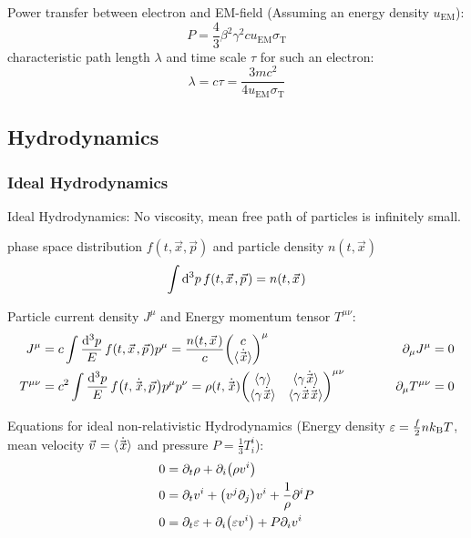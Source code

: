 			Power transfer between electron and EM-field (Assuming an energy density $u_\text{EM}$):
			\begin{equation}
				P = \frac{4}{3} \beta^2 \gamma^2 c u_\text{EM} \sigma_\text{T}
			\end{equation}
			characteristic path length $\lambda$ and time scale $\tau$ for such an electron:
			\begin{equation}
				\lambda = c\tau = \frac{3 m c^2}{4 u_\text{EM} \sigma_\text{T}}
			\end{equation}



	\subsection{Hydrodynamics}
		\subsubsection{Ideal Hydrodynamics}	
			Ideal Hydrodynamics: No viscosity, mean free path of particles is infinitely small.

			\noindent
			phase space distribution $f(t, \vec{x},\vec{p})$ and particle density $n(t,\vec{x})$
			\begin{equation}
				\int \dd^3 p\, f\qty(t, \vec{x}, \vec{p}) = n\qty(t,\vec{x})
			\end{equation}

			\noindent
			Particle current density $J^\mu$ and Energy momentum tensor $T^{\mu\nu}$:
			\begin{equation}
				\begin{aligned}
					J^{\mu} &= c \int \frac{\dd^3 p}{E}\, f\qty(t, \vec{x}, \vec{p}) p^{\mu} = \frac{n(t, \vec{x})}{c} \mqty(c\\\avg{\dot{\vec{x}}})^\mu 
					&\hsp
					\partial_\mu J^{\mu} &= 0 \\
					T^{\mu\nu} &= c^2 \int \frac{\dd^3 p}{E}\, f\qty(t, \dot{\vec{x}}, \vec{p}) p^{\mu} p^{\nu} =\rho(t, \dot{\vec{x}})\mqty(\avg{\gamma} & \avg{\gamma \dot{\vec{x}}} \\ \avg{\gamma \dot{\vec{x}}} & \avg{\gamma\dot{\vec{x}}\dot{\vec{x}}})^{\mu\nu}
					&\hsp
					\partial_\mu T^{\mu\nu} &= 0 \\
				\end{aligned}
			\end{equation}

			\noindent
			Equations for ideal non-relativistic Hydrodynamics (Energy density $\varepsilon=\frac{f}{2} n k_{\text{B}} T$, mean velocity $\vec{v}=\avg{\dot{\vec{x}}}$ and pressure $P = \frac{1}{3} T^{i}_i$):
			\begin{equation}
				\begin{aligned}
					0 &= \partial_t \rho + \partial_i \qty(\rho v^i) \\
					0 &= \partial_t v^i + \qty(v^j \partial_j) v^i + \frac{1}{\rho} \partial^i P \\
					0 &= \partial_t \varepsilon + \partial_i \qty(\varepsilon v^i) + P \partial_i v^i  \\
				\end{aligned}
			\end{equation}

